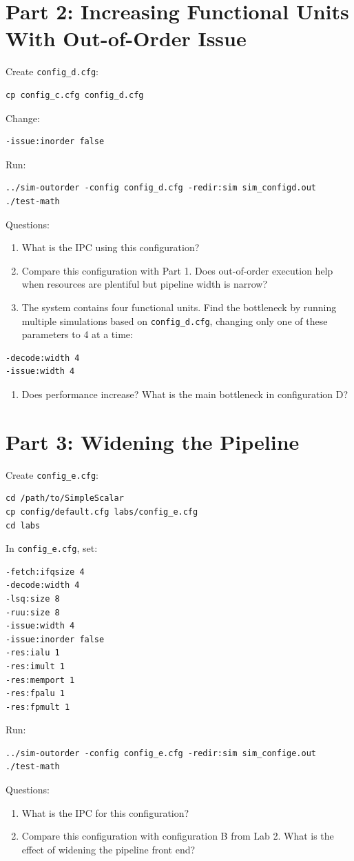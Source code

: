 \documentclass[11pt]{article}
\begin{document}
\section{Part 2: Increasing Functional Units With Out-of-Order Issue}
Create \texttt{config\_d.cfg}:
\begin{lstlisting}
cp config_c.cfg config_d.cfg
\end{lstlisting}
Change:
\begin{lstlisting}
-issue:inorder false
\end{lstlisting}
Run:
\begin{lstlisting}
../sim-outorder -config config_d.cfg -redir:sim sim_configd.out ./test-math
\end{lstlisting}
Questions:
\begin{enumerate}
\item What is the IPC using this configuration?
\item Compare this configuration with Part 1. Does out-of-order execution help when resources are plentiful but pipeline width is narrow?
\item The system contains four functional units. Find the bottleneck by running multiple simulations based on \texttt{config\_d.cfg}, changing only one of these parameters to 4 at a time:
\end{enumerate}
\begin{lstlisting}
-decode:width 4
-issue:width 4
\end{lstlisting}
\begin{enumerate}
\item Does performance increase? What is the main bottleneck in configuration D?
\end{enumerate}
\section{Part 3: Widening the Pipeline}
Create \texttt{config\_e.cfg}:
\begin{lstlisting}
cd /path/to/SimpleScalar
cp config/default.cfg labs/config_e.cfg
cd labs
\end{lstlisting}
In \texttt{config\_e.cfg}, set:
\begin{lstlisting}
-fetch:ifqsize 4
-decode:width 4
-lsq:size 8
-ruu:size 8
-issue:width 4
-issue:inorder false
-res:ialu 1
-res:imult 1
-res:memport 1
-res:fpalu 1
-res:fpmult 1
\end{lstlisting}
Run:
\begin{lstlisting}
../sim-outorder -config config_e.cfg -redir:sim sim_confige.out ./test-math
\end{lstlisting}
Questions:
\begin{enumerate}
\item What is the IPC for this configuration?
\item Compare this configuration with configuration B from Lab 2. What is the effect of widening the pipeline front end?
\end{enumerate}
\end{document}
